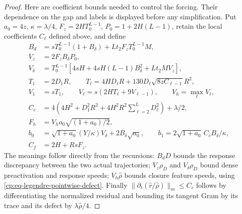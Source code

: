 \begin{proof}
Here are coefficient bounds needed to control the forcing.  Their
dependence on the gap and labels is displayed before any simplification.
Put $a_0=4z$, $\kappa=\lambda/4$, $F_z=2HT_0^{L-1}$,
$P_0=1+2H(L-1)$, retain the local coefficients $C_\ell$ defined above, and define
\begin{align*}
 B_d&=sT_0^{L-1}(1+B_\delta)+Lt_2F_zT_0^{L-1}M,\\
 V_z&=2F_zB_\delta P_0,\\
 V_\delta&=T_0^{L-1}
   [4sH+4sH(L-1)B_\delta^2+Lt_2MV_z],\\
 T_1&=2D_1R,\qquad
 T_\ell=4HD_\ell R+130D_\ell\sqrt{8zC_{\ell-1}}R^2,\\
 V_1&=sT_1,\qquad V_\ell=s(2HT_\ell+9V_{\ell-1}),
       \qquad V_h=\max_\ell V_\ell,\\
 C_c&=4\left(4H^2+D_1^2R^2+
                    4H^2R^2\sum_{\ell=2}^LD_\ell^2\right)+\lambda/2,\\
 F_h&=V_ha_0\sqrt{(1+a_0)/2},\\
 b_0&=\sqrt{1+a_0}(Y/\kappa)V_\delta+2B_\delta\sqrt{a_0},
       \qquad b_1=2\sqrt{1+a_0}\,C_cB_\delta/\kappa,\\
 C_f&=2H+RsF_z.
\end{align*}
The meanings follow directly from the recursions: $B_dD$ bounds the
response discrepancy between the two actual trajectories; $V_z\rho_D$
and $V_\delta\rho_D$ bound dense preactivation and response speeds;
$V_h\widehat\rho$ bounds closure feature speeds, using
\eqref{cp:eq-legendre-pointwise-defect}.  Finally
$\|\partial_t(\widehat r/\widehat\rho)\|_m\le C_c$ follows by
differentiating the normalized residual and bounding its tangent Gram
by its trace and its defect by $\lambda\widehat\rho/4$.


\end{proof}
